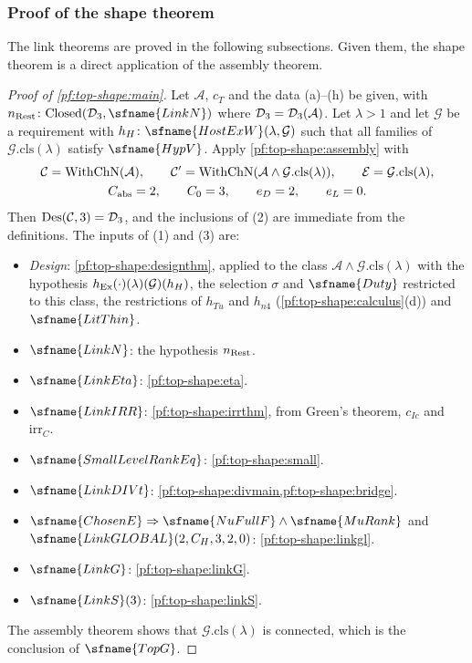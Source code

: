 \subsubsection*{Proof of the shape theorem}

The link theorems are proved in the following subsections. Given them, the shape theorem is a direct
application of the assembly theorem.

\begin{proof}[Proof of \cref{pf:top-shape:main}]
Let $\mathcal A$, $c_T$ and the data (a)--(h) be given, with $n_{\rm Rest}\colon\topshapeCl(\topshapeD,
\sfname{LinkN})$ where $\mathcal{D}_3=\mathcal{D}_3(\mathcal A)$. Let $\lambda>1$ and let $\mathcal G$ be a requirement
with $h_H\colon\sfname{HostExW}(\lambda,\mathcal G)$ such that all families of $\mathcal G.\mathrm{cls}(\lambda)$
satisfy $\sfname{HypV}$. Apply \cref{pf:top-shape:assembly} with
\begin{gather*}
\mathcal C=\mathrm{WithChN}(\mathcal A),\qquad\mathcal C'=\mathrm{WithChN}(\mathcal A\wedge\mathcal G.\mathrm{cls}(\lambda)),
\qquad\mathcal E=\mathcal G.\mathrm{cls}(\lambda),\\
C_{\rm abs}=2,\qquad C_0=3,\qquad e_D=2,\qquad e_L=0 .
\end{gather*}
Then $\mathrm{Des}(\mathcal C,3)=\mathcal{D}_3$, and the inclusions of (2) are immediate from the definitions. The
inputs of (1) and (3) are:
\begin{itemize}
\item \emph{Design}: \cref{pf:top-shape:designthm}, applied to the class $\mathcal A\wedge\mathcal
G.\mathrm{cls}(\lambda)$ with the hypothesis $h_{\rm Ex}(\cdot)(\lambda)(\mathcal G)(h_H)$, the selection $\sigma$
and $\sfname{Duty}$ restricted to this class, the restrictions of $h_{Tu}$ and $h_{n4}$
(\cref{pf:top-shape:calculus}(d)) and $\sfname{LitThin}$.
\item $\sfname{LinkN}$: the hypothesis $n_{\rm Rest}$.
\item $\sfname{LinkEta}$: \cref{pf:top-shape:eta}.
\item $\sfname{LinkIRR}$: \cref{pf:top-shape:irrthm}, from Green's theorem, $c_{Ic}$ and $\mathrm{irr}_C$.
\item $\sfname{SmallLevelRankEq}$: \cref{pf:top-shape:small}.
\item $\sfname{LinkDIVt}$: \cref{pf:top-shape:divmain,pf:top-shape:bridge}.
\item $\sfname{ChosenE}\Rightarrow\sfname{NuFullF}\wedge\sfname{MuRank}$ and $\sfname{LinkGLOBAL}(2,C_H,3,2,0)$:
\cref{pf:top-shape:linkgl}.
\item $\sfname{LinkG}$: \cref{pf:top-shape:linkG}.
\item $\sfname{LinkS}(3)$: \cref{pf:top-shape:linkS}.
\end{itemize}
The assembly theorem shows that $\mathcal G.\mathrm{cls}(\lambda)$ is connected, which is the conclusion of
$\sfname{TopG}$.
\end{proof}

